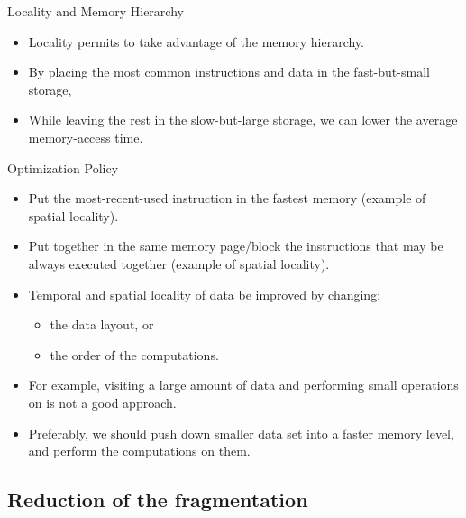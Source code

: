 \begin{bibunit}[apalike]
\begin{frame}{Locality and Memory Hierarchy}
	\begin{itemize}
	\item Locality permits to take advantage of the memory hierarchy.
	\vfill
	\item By placing the most common instructions and data in the fast-but-small storage, 
	\vfill
	\item While leaving the rest in the slow-but-large storage, we can lower the average memory-access time.
	\end{itemize}
\end{frame}

\begin{frame}{Optimization Policy}
	\begin{small}
	\begin{itemize}
	\item Put the most-recent-used instruction in the fastest memory (example of spatial locality).
	\item Put together in the same memory page/block the instructions that may be always executed together (example of spatial locality).
	\item Temporal and spatial locality of data be improved by changing:
		\begin{itemize}
		\item the data layout, or
		\item the order of the computations.
		\end{itemize}
	\end{itemize}
	\begin{example}
		\begin{itemize}
		\item For example, visiting a large amount of data and performing small operations on is not a good approach.
		\item Preferably, we should push down smaller data set into a faster memory level, and perform the computations on them.
		\end{itemize}
	\end{example}
	\end{small}
\end{frame}

\subsection{Reduction of the fragmentation}

\tableofcontentslide[sections={1-5},sectionstyle={show/shaded},subsectionstyle={show/shaded/hide},subsubsectionstyle={hide/hide/hide/hide}]


\end{bibunit}
